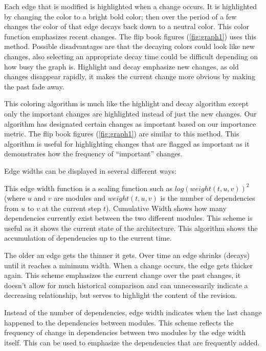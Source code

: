 \documentclass[times, 10pt,twocolumn]{article}
\begin{document}
 Each edge that is modified is
highlighted when a change occurs. It is highlighted by changing the
color to a bright bold color; then over the period of a few changes
the color of that edge decays back down to a neutral color. This color
function emphasizes recent changes. The flip book figures
(\ref{fig:graph1}) uses this method.  Possible disadvantages are
that the decaying colors could look like new changes, also selecting
an appropriate decay time could be difficult depending on how busy the
graph is. Highlight and decay emphasize new changes, as old changes
disappear rapidly, it makes the current change more obvious by making
the past fade away.


 This coloring algorithm is
much like the highlight and decay algorithm except only the important
changes are highlighted instead of just the new changes.  Our
algorithm has designated certain changes as important based on our
importance metric.  The flip book figures (\ref{fig:graph1}) are
similar to this method.  This algorithm is
useful for highlighting changes that are flagged as important as it
demonstrates how the frequency of ``important'' changes.


Edge widths can be displayed in several different ways:


 This edge width function is a scaling
function such as $log(weight(t,u,v))^2$ (where $u$ and $v$ are modules
and $weight(t,u,v)$ is the number of dependencies from $u$ to $v$ at
the current step $t$). Cumulative Width shows how many dependencies
currently exist between the two different modules. This scheme is
useful as it shows the current state of the architecture. This
algorithm shows the accumulation of dependencies up to the current
time.


 The older an edge gets the thinner it
gets.  Over time an edge shrinks (decays) until it reaches a minimum
width. When a change occurs, the edge gets thicker again. This scheme
emphasizes the current change over the past changes, it doesn't allow
for much historical comparison and can unnecessarily indicate a
decreasing relationship, but serves to highlight the content of the
revision.

 Instead of the number of dependencies,
edge width indicates when the last change happened to the dependencies
between modules. This scheme reflects the frequency of change in
dependencies between two modules by the edge width itself. This can be
used to emphasize the dependencies that are frequently added.
\end{document}
